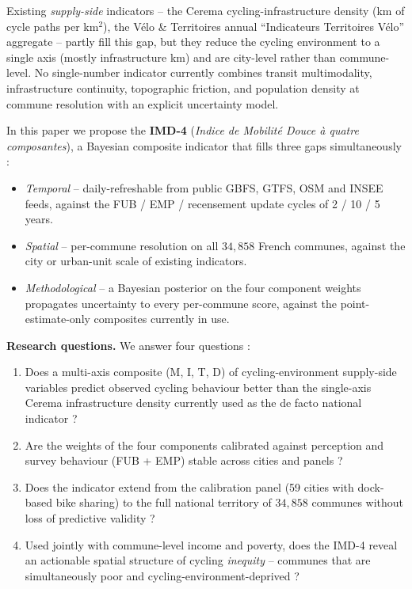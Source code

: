 \documentclass[11pt,a4paper]{article}
\begin{document}
Existing \emph{supply-side} indicators -- the Cerema cycling-infrastructure
density (km of cycle paths per km$^2$), the V\'elo \& Territoires annual
``Indicateurs Territoires V\'elo'' aggregate -- partly fill this gap,
but they reduce the cycling environment to a single axis (mostly
infrastructure km) and are city-level rather than commune-level.  No
single-number indicator currently combines transit multimodality,
infrastructure continuity, topographic friction, and population
density at commune resolution with an explicit uncertainty model.

In this paper we propose the \textbf{IMD-4} (\emph{Indice de Mobilit\'e
Douce \`a quatre composantes}), a Bayesian composite indicator that
fills three gaps simultaneously :

\begin{itemize}[label=$\bullet$,leftmargin=*]
    \item \emph{Temporal} -- daily-refreshable from public GBFS, GTFS,
          OSM and INSEE feeds, against the FUB / EMP / recensement
          update cycles of 2 / 10 / 5 years.
    \item \emph{Spatial} -- per-commune resolution on all $34{,}858$
          French communes, against the city or urban-unit scale of
          existing indicators.
    \item \emph{Methodological} -- a Bayesian posterior on the
          four component weights propagates uncertainty to every
          per-commune score, against the point-estimate-only
          composites currently in use.
\end{itemize}

\noindent\textbf{Research questions.}
We answer four questions :

\begin{enumerate}[leftmargin=*]
    \item[\textbf{Q1}] Does a multi-axis composite (M, I, T, D) of
          cycling-environment supply-side variables predict observed
          cycling behaviour better than the single-axis Cerema
          infrastructure density currently used as the de facto
          national indicator ?

    \item[\textbf{Q2}] Are the weights of the four components
          calibrated against perception and survey behaviour
          (FUB + EMP) stable across cities and panels ?

    \item[\textbf{Q3}] Does the indicator extend from the calibration
          panel (59 cities with dock-based bike sharing) to the full
          national territory of $34{,}858$ communes without loss of
          predictive validity ?

    \item[\textbf{Q4}] Used jointly with commune-level income and
          poverty, does the IMD-4 reveal an actionable spatial
          structure of cycling \emph{inequity} -- communes that are
          simultaneously poor and cycling-environment-deprived ?
\end{enumerate}
\end{document}
